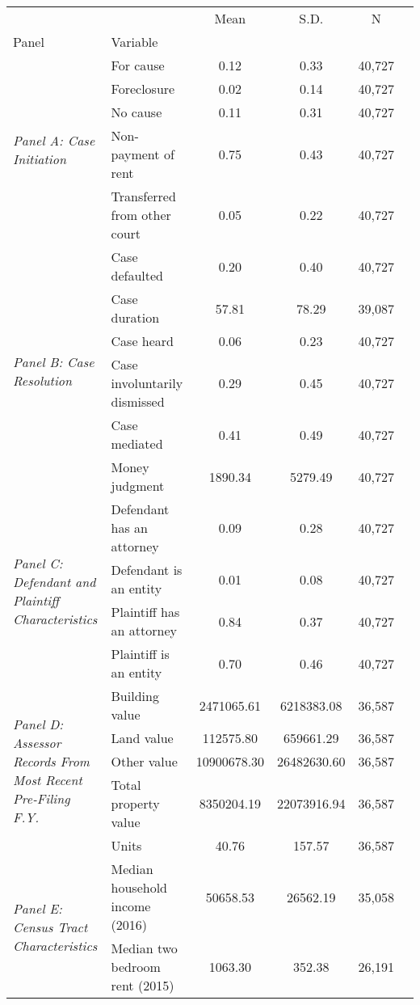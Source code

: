 \begin{tabular}{llcccc}
\toprule
 &  & Mean & S.D. & N \\
Panel & Variable &  &  &  \\
\midrule
\multirow[c]{5}{4cm}{\textit{Panel A: Case Initiation}} & For cause & 0.12 & 0.33 & 40,727 \\
 & Foreclosure & 0.02 & 0.14 & 40,727 \\
 & No cause & 0.11 & 0.31 & 40,727 \\
 & Non-payment of rent & 0.75 & 0.43 & 40,727 \\
 & Transferred from other court & 0.05 & 0.22 & 40,727 \\
\cline{1-5}
\multirow[c]{6}{4cm}{\textit{Panel B: Case Resolution}} & Case defaulted & 0.20 & 0.40 & 40,727 \\
 & Case duration & 57.81 & 78.29 & 39,087 \\
 & Case heard & 0.06 & 0.23 & 40,727 \\
 & Case involuntarily dismissed & 0.29 & 0.45 & 40,727 \\
 & Case mediated & 0.41 & 0.49 & 40,727 \\
 & Money judgment & 1890.34 & 5279.49 & 40,727 \\
\cline{1-5}
\multirow[c]{4}{4cm}{\textit{Panel C: Defendant and Plaintiff Characteristics}} & Defendant has an attorney & 0.09 & 0.28 & 40,727 \\
 & Defendant is an entity & 0.01 & 0.08 & 40,727 \\
 & Plaintiff has an attorney & 0.84 & 0.37 & 40,727 \\
 & Plaintiff is an entity & 0.70 & 0.46 & 40,727 \\
\cline{1-5}
\multirow[c]{5}{4cm}{\textit{Panel D: Assessor Records From Most Recent Pre-Filing F.Y.}} & Building value & 2471065.61 & 6218383.08 & 36,587 \\
 & Land value & 112575.80 & 659661.29 & 36,587 \\
 & Other value & 10900678.30 & 26482630.60 & 36,587 \\
 & Total property value & 8350204.19 & 22073916.94 & 36,587 \\
 & Units & 40.76 & 157.57 & 36,587 \\
\cline{1-5}
\multirow[c]{4}{4cm}{\textit{Panel E: Census Tract Characteristics}} & Median household income (2016) & 50658.53 & 26562.19 & 35,058 \\
 & Median two bedroom rent (2015) & 1063.30 & 352.38 & 26,191 \\

\end{tabular}

